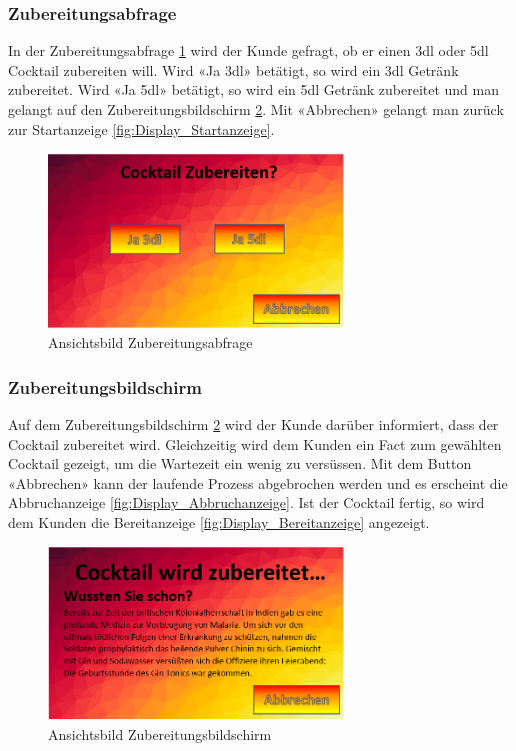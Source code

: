 \subsubsection{Zubereitungsabfrage}\label{subsubsec:Display_Zubereitungsabfrage}

In der Zubereitungsabfrage \ref{fig:Display_Zubereitungsabfrage} wird der Kunde gefragt, ob er einen 3dl oder 5dl Cocktail zubereiten will. Wird «Ja 3dl» betätigt, so wird ein 3dl Getränk zubereitet. Wird «Ja 5dl» betätigt, so wird ein 5dl Getränk zubereitet und man gelangt auf den Zubereitungsbildschirm \ref{fig:Display_Zubereitungsbildschirm}. Mit «Abbrechen» gelangt man zurück zur Startanzeige \ref{fig:Display_Startanzeige}.

\begin{figure}[h!]
\centering
\includegraphics[width=0.7\textwidth]{graphics/Display_Zubereitungsabfrage.png}
\caption{Ansichtsbild Zubereitungsabfrage}
\label{fig:Display_Zubereitungsabfrage}
\end{figure}

\subsubsection{Zubereitungsbildschirm}\label{subsubsec:Display_Zubereitungsbildschirm}

Auf dem Zubereitungsbildschirm \ref{fig:Display_Zubereitungsbildschirm} wird der Kunde darüber informiert, dass der Cocktail zubereitet wird. Gleichzeitig wird dem Kunden ein Fact zum gewählten Cocktail gezeigt, um die Wartezeit ein wenig zu versüssen. Mit dem Button «Abbrechen» kann der laufende Prozess abgebrochen werden und es erscheint die Abbruchanzeige \ref{fig:Display_Abbruchanzeige}. Ist der Cocktail fertig, so wird dem Kunden die Bereitanzeige \ref{fig:Display_Bereitanzeige} angezeigt. 

\begin{figure}[h!]
\centering
\includegraphics[width=0.7\textwidth]{graphics/Display_Zubereitungsbildschirm.png}
\caption{Ansichtsbild Zubereitungsbildschirm}
\label{fig:Display_Zubereitungsbildschirm}
\end{figure}

